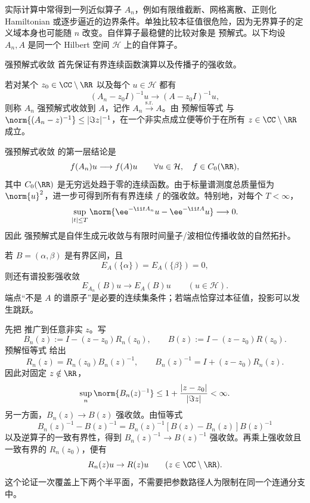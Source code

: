实际计算中常得到一列近似算子 $A_n$，例如有限维截断、网格离散、正则化 Hamiltonian 或逐步逼近的边界条件。单独比较本征值很危险，因为无界算子的定义域本身也可能随 $n$ 改变。自伴算子最稳健的比较对象是 预解式。以下均设 $A_n,A$ 是同一个 Hilbert 空间 $\mathcal H$ 上的自伴算子。

强预解式收敛 首先保证有界连续函数演算以及传播子的强收敛。

若对某个 $z_0\in\CC\setminus\RR$ 以及每个 $u\in\mathcal H$ 都有
\begin{equation}\label{eq:math-sl-strong-resolvent-def}
 (A_n-z_0I)^{-1}u\longrightarrow(A-z_0I)^{-1}u,
\end{equation}
则称 $A_n$ 强预解式收敛到 $A$，记作 $A_n\xrightarrow{\mathrm{s.r.}}A$。由 预解恒等式 与
$\norm{(A_n-z)^{-1}}\le|\Im z|^{-1}$，在一个非实点成立便等价于在所有 $z\in\CC\setminus\RR$ 成立。

强预解式收敛 的第一层结论是
\begin{equation}\label{eq:math-sl-strong-resolvent-c0}
 f(A_n)u\longrightarrow f(A)u
 \qquad
 \forall u\in\mathcal H,
 \quad f\in C_0(\RR),
\end{equation}
其中 $C_0(\RR)$ 是无穷远处趋于零的连续函数。由于标量谱测度总质量恒为 $\norm{u}^2$，进一步可得到所有有界连续 $f$ 的强收敛。特别地，对每个 $T<\infty$，
\begin{equation}\label{eq:math-sl-strong-resolvent-unitary}
 \sup_{|t|\le T}
 \norm{\ee^{-\ii tA_n}u-\ee^{-\ii tA}u}
 \longrightarrow0.
\end{equation}
因此 强预解式是自伴生成元收敛与有限时间量子/波相位传播收敛的自然拓扑。

若 $B=(\alpha,\beta)$ 是有界区间，且
\[
 E_A(\{\alpha\})=E_A(\{\beta\})=0,
\]
则还有谱投影强收敛
\begin{equation}\label{eq:math-sl-strong-spectral-projection}
 E_{A_n}(B)u\longrightarrow E_A(B)u
 \qquad(u\in\mathcal H).
\end{equation}
端点“不是 $A$ 的谱原子”是必要的连续集条件；若端点恰穿过本征值，投影可以发生跳跃。

先把 推广到任意非实 $z$。写
\[
 B_n(z):=I-(z-z_0)R_n(z_0),
 \qquad
 B(z):=I-(z-z_0)R(z_0).
\]
预解恒等式 给出
\[
 R_n(z)=R_n(z_0)B_n(z)^{-1},
 \qquad
 B_n(z)^{-1}=I+(z-z_0)R_n(z).
\]
因此对固定 $z\notin\RR$，
\[
 \sup_n\norm{B_n(z)^{-1}}
 \le1+\frac{|z-z_0|}{|\Im z|}<\infty.
\]
另一方面，$B_n(z)\to B(z)$ 强收敛。由恒等式
\[
 B_n(z)^{-1}-B(z)^{-1}
 =B_n(z)^{-1}[B(z)-B_n(z)]B(z)^{-1}
\]
以及逆算子的一致有界性，得到 $B_n(z)^{-1}\to B(z)^{-1}$ 强收敛。再乘上强收敛且一致有界的 $R_n(z_0)$，便有
\[
 R_n(z)u\to R(z)u
 \qquad(z\in\CC\setminus\RR).
\]
这个论证一次覆盖上下两个半平面，不需要把参数路径人为限制在同一个连通分支中。

